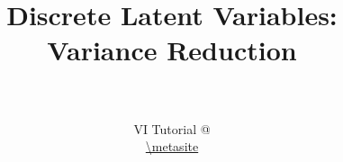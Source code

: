 \documentclass[14pt]{beamer}
\title[Variance Reduction]{Discrete Latent Variables:\\Variance Reduction}
\date{}
\author[VI Tutorial @ \metahost]{ \metaauthor \\ 
~\\
VI Tutorial @ \metahost \\
\url{\metasite}
}
\begin{document}
\frame{\titlepage}



\end{document}
